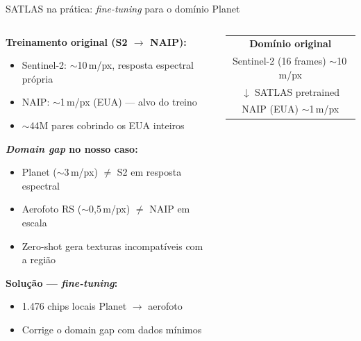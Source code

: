 \documentclass[aspectratio=169]{beamer}
\begin{document}
\begin{frame}{SATLAS na prática: \textit{fine-tuning} para o domínio Planet}

  \begin{columns}[T]
    \begin{column}{0.50\textwidth}
      \small
      \textbf{Treinamento original (S2 $\to$ NAIP):}
      \begin{itemize}
        \item Sentinel-2: $\sim$10\,m/px, resposta espectral própria
        \item NAIP: $\sim$1\,m/px (EUA) — alvo do treino
        \item $\sim$44M pares cobrindo os EUA inteiros
      \end{itemize}
      \vspace{0.3em}
      \textbf{\textit{Domain gap} no nosso caso:}
      \begin{itemize}
        \item Planet ($\sim$3\,m/px) $\neq$ S2 em resposta espectral
        \item Aerofoto RS ($\sim$0{,}5\,m/px) $\neq$ NAIP em escala
        \item Zero-shot gera texturas incompatíveis com a região
      \end{itemize}
      \vspace{0.3em}
      \textbf{Solução --- \textit{fine-tuning}:}
      \begin{itemize}
        \item 1.476 chips locais Planet $\to$ aerofoto
        \item Corrige o domain gap com dados mínimos
      \end{itemize}
    \end{column}
    \begin{column}{0.46\textwidth}
      \centering
      \begin{tabular}{c}
        \textbf{Domínio original} \\[0.3em]
        \fbox{\parbox{0.85\linewidth}{\centering\small
          Sentinel-2 (16 frames)\\$\sim$10\,m/px
        }}\\[0.2em]
        $\downarrow$ SATLAS pretrained \\[0.2em]
        \fbox{\parbox{0.85\linewidth}{\centering\small
          NAIP (EUA)\\$\sim$1\,m/px
        }}\\[0.8em]


\end{tabular}
\end{column}
\end{columns}
\end{frame}
\end{document}
